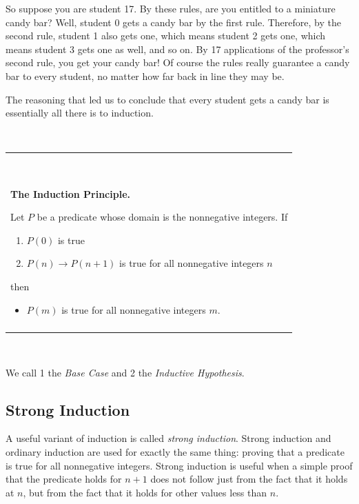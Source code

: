 \documentclass[11pt,oneside]{book}
\theoremstyle{definition}
\begin{document}
So suppose you are student 17.
By these rules, are you entitled to a miniature candy bar?
Well, student 0 gets a candy bar by the first rule. Therefore, by the second rule, student 1 also gets one, which means student 2 gets one, which means student 3 gets one as well, and so on.
By 17 applications of the professor's second rule, you get your candy bar!
Of course the rules really guarantee a candy bar to every student, no matter how far back in line they may be.

The reasoning that led us to conclude that every student gets a candy bar is essentially all there is to induction.

\

\noindent\begin{tabular}{|p{6.5in}|}
    \hline
    \

    \textbf{\huge The Induction Principle.}

    Let $P$ be a predicate whose domain is the nonnegative integers.
    If
    \begin{enumerate}
        \item $P(0)$ is true

        \item $P(n) \rightarrow P(n + 1)$ is true for all nonnegative integers $n$
    \end{enumerate}
    then
    \begin{itemize}
        \item $P(m)$ is true for all nonnegative integers $m$.
    \end{itemize}

    \\\\
    \hline
\end{tabular}

\

We call 1 the \emph{Base Case} and 2 the \emph{Inductive Hypothesis}.


\subsection{Strong Induction}
A useful variant of induction is called \emph{strong induction}.
Strong induction and ordinary induction are used for exactly the same thing: proving that a predicate is true for all nonnegative integers.
Strong induction is useful when a simple proof that the predicate holds for $n + 1$ does not follow just from the fact that it holds at $n$, but from the fact that it holds for other values less than $n$.
\end{document}
